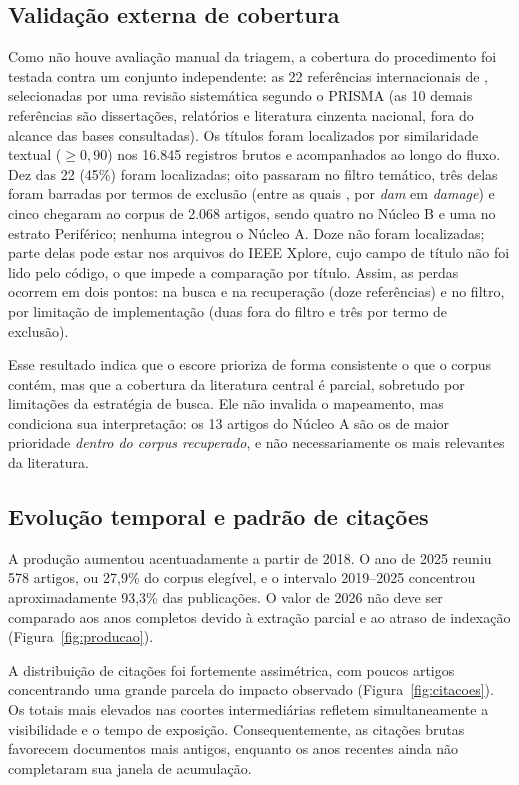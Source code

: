 \subsection{Validação externa de cobertura}
\label{sec:art-validacao}

Como não houve avaliação manual da triagem, a cobertura do procedimento foi testada contra um conjunto independente: as 22 referências internacionais de , selecionadas por uma revisão sistemática segundo o PRISMA (as 10 demais referências são dissertações, relatórios e literatura cinzenta nacional, fora do alcance das bases consultadas). Os títulos foram localizados por similaridade textual ($\geq 0{,}90$) nos 16.845 registros brutos e acompanhados ao longo do fluxo. Dez das 22 (45\%) foram localizadas; oito passaram no filtro temático, três delas foram barradas por termos de exclusão (entre as quais , por \textit{dam} em \textit{damage}) e cinco chegaram ao corpus de 2.068 artigos, sendo quatro no Núcleo B e uma no estrato Periférico; nenhuma integrou o Núcleo A. Doze não foram localizadas; parte delas pode estar nos arquivos do IEEE Xplore, cujo campo de título não foi lido pelo código, o que impede a comparação por título. Assim, as perdas ocorrem em dois pontos: na busca e na recuperação (doze referências) e no filtro, por limitação de implementação (duas fora do filtro e três por termo de exclusão).

Esse resultado indica que o escore prioriza de forma consistente o que o corpus contém, mas que a cobertura da literatura central é parcial, sobretudo por limitações da estratégia de busca. Ele não invalida o mapeamento, mas condiciona sua interpretação: os 13 artigos do Núcleo A são os de maior prioridade \textit{dentro do corpus recuperado}, e não necessariamente os mais relevantes da literatura.

\subsection{Evolução temporal e padrão de citações}

A produção aumentou acentuadamente a partir de 2018. O ano de 2025 reuniu 578 artigos, ou 27,9\% do corpus elegível, e o intervalo 2019--2025 concentrou aproximadamente 93,3\% das publicações. O valor de 2026 não deve ser comparado aos anos completos devido à extração parcial e ao atraso de indexação (Figura~\ref{fig:producao}).

A distribuição de citações foi fortemente assimétrica, com poucos artigos concentrando uma grande parcela do impacto observado (Figura~\ref{fig:citacoes}). Os totais mais elevados nas coortes intermediárias refletem simultaneamente a visibilidade e o tempo de exposição. Consequentemente, as citações brutas favorecem documentos mais antigos, enquanto os anos recentes ainda não completaram sua janela de acumulação.

